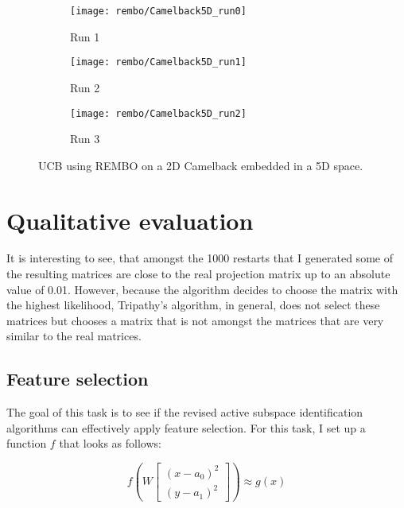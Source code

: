 \begin{figure}[H]
\center
    \begin{subfigure}[b]{0.30\textwidth}
        \texttt{[image: rembo/Camelback5D\_run0]}
        \label{fig:gull}
         \caption{Run 1}
    \end{subfigure}
        \begin{subfigure}[b]{0.30\textwidth}
        \texttt{[image: rembo/Camelback5D\_run1]}
        \label{fig:gull}
        \caption{Run 2}
    \end{subfigure}
    \begin{subfigure}[b]{0.30\textwidth}
        \texttt{[image: rembo/Camelback5D\_run2]}
        \label{fig:gull}
               \caption{Run 3}
    \end{subfigure}
        \caption{UCB using REMBO on a 2D Camelback embedded in a 5D space.
    }\label{fig:animals}
\end{figure}


\section{Qualitative evaluation}
It is interesting to see, that amongst the 1000 restarts that I generated some of the resulting matrices are close to the real projection matrix up to an absolute value of 0.01.
However, because the algorithm decides to choose the matrix with the highest likelihood, Tripathy's algorithm, in general, does not select these matrices but chooses a matrix that is not amongst the matrices that are very similar to the real matrices.

\subsection{Feature selection}
The goal of this task is to see if the revised active subspace identification algorithms can effectively apply feature selection.
For this task, I set up a function $ f $ that looks as follows:

\def\B{
\begin{bmatrix}
    (x - a_0)^2 \\
    (y - a_1)^2
\end{bmatrix}}

\begin{equation} \label{eq:FeatureExtension}
f \left( W \B \right) \approx g \left( x \right)
\end{equation} 

